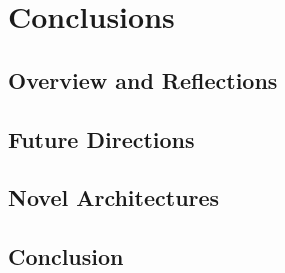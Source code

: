 \section{Conclusions}

\subsection{Overview and Reflections}

\subsection{Future Directions}

\subsection{Novel Architectures}

\subsection{Conclusion}